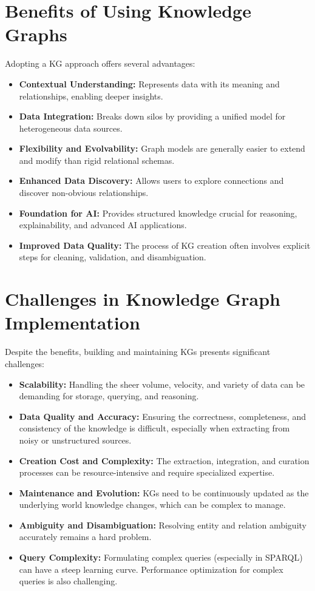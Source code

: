 \documentclass[11pt, a4paper]{article}
\begin{document}
\section{Benefits of Using Knowledge Graphs}
\label{sec:benefits}

Adopting a KG approach offers several advantages:

\begin{itemize}
    \item \textbf{Contextual Understanding:} Represents data with its meaning and relationships, enabling deeper insights.
    \item \textbf{Data Integration:} Breaks down silos by providing a unified model for heterogeneous data sources.
    \item \textbf{Flexibility and Evolvability:} Graph models are generally easier to extend and modify than rigid relational schemas.
    \item \textbf{Enhanced Data Discovery:} Allows users to explore connections and discover non-obvious relationships.
    \item \textbf{Foundation for AI:} Provides structured knowledge crucial for reasoning, explainability, and advanced AI applications.
    \item \textbf{Improved Data Quality:} The process of KG creation often involves explicit steps for cleaning, validation, and disambiguation.
\end{itemize}

\section{Challenges in Knowledge Graph Implementation}
\label{sec:challenges}

Despite the benefits, building and maintaining KGs presents significant challenges:

\begin{itemize}
    \item \textbf{Scalability:} Handling the sheer volume, velocity, and variety of data can be demanding for storage, querying, and reasoning.
    \item \textbf{Data Quality and Accuracy:} Ensuring the correctness, completeness, and consistency of the knowledge is difficult, especially when extracting from noisy or unstructured sources.
    \item \textbf{Creation Cost and Complexity:} The extraction, integration, and curation processes can be resource-intensive and require specialized expertise.
    \item \textbf{Maintenance and Evolution:} KGs need to be continuously updated as the underlying world knowledge changes, which can be complex to manage.
    \item \textbf{Ambiguity and Disambiguation:} Resolving entity and relation ambiguity accurately remains a hard problem.
    \item \textbf{Query Complexity:} Formulating complex queries (especially in SPARQL) can have a steep learning curve. Performance optimization for complex queries is also challenging.
\end{itemize}
\end{document}
